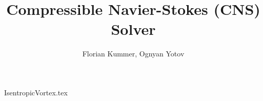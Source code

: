 \documentclass[10pt,a4paper]{article}
\title{Compressible Navier-Stokes (CNS) Solver}
\author{Florian Kummer, Ognyan Yotov}
\begin{document}
\maketitle

{IsentropicVortex.tex}
\end{document}
